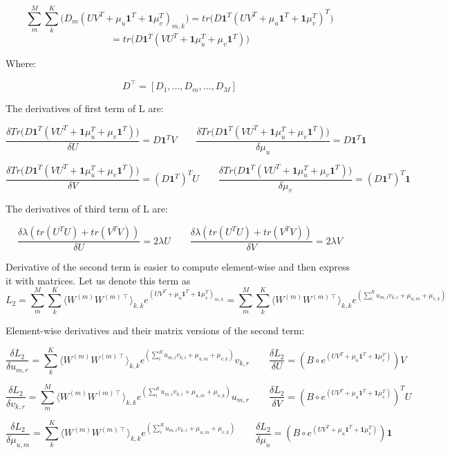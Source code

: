 \documentclass{article}
\begin{document}
$$\sum_m^M{\sum_k^K{\Big(D_m (UV^T+\mu_u\textbf{1}^T+\textbf{1}\mu_v^T)_{m,k}\Big)}} = tr\Big(D\textbf{1}^T(UV^T+\mu_u\textbf{1}^T+\textbf{1}\mu_v^T)^T\Big)$$
$$= tr\Big(D\textbf{1}^T(VU^T+\textbf{1}\mu_u^T+\mu_v\textbf{1}^T)\Big)$$

Where:

$$D^\intercal = [D_1,...,D_m,...,D_M]$$

The derivatives of first term of L are:

$$\frac{\delta Tr\Big(D\textbf{1}^T(VU^T+\textbf{1}\mu_u^T+\mu_v\textbf{1}^T)\Big)}{\delta U} = D\textbf{1}^TV \qquad \frac{\delta Tr\Big(D\textbf{1}^T(VU^T+\textbf{1}\mu_u^T+\mu_v\textbf{1}^T)\Big)}{\delta \mu_u} = D\textbf{1}^T\textbf{1}$$

$$\frac{\delta Tr\Big(D\textbf{1}^T(VU^T+\textbf{1}\mu_u^T+\mu_v\textbf{1}^T)\Big)}{\delta V} = (D\textbf{1}^T)^TU \qquad \frac{\delta Tr\Big(D\textbf{1}^T(VU^T+\textbf{1}\mu_u^T+\mu_v\textbf{1}^T)\Big)}{\delta \mu_v} = (D\textbf{1}^T)^T\textbf{1}$$

The derivatives of third term of L are:

$$\frac{\delta \lambda (tr(U^TU)+tr(V^TV))}{\delta U} = 2\lambda U \qquad \frac{\delta \lambda (tr(U^TU)+tr(V^TV))}{\delta V} = 2\lambda V$$

Derivative of the second term is easier to compute element-wise and then express it with matrices. Let us denote this term as $$L_2=\sum_m^M{\sum_k^K{\langle W^{(m)}W^{(m)\intercal}\rangle_{k,k}e^{(UV^T+\mu_u\textbf{1}^T+\textbf{1}\mu_v^T)_{m,k}} }} = \sum_m^M{\sum_k^K{\langle W^{(m)}W^{(m)\intercal}\rangle_{k,k}e^{(\sum_i^R{u_{m,i}v_{k,i}}+\mu_{u,m}+\mu_{v,k})} }}$$

Element-wise derivatives and their matrix versions of the second term:

$$\frac{\delta L_2}{\delta u_{m,r}} = \sum_k^K{\langle W^{(m)}W^{(m)\intercal}\rangle_{k,k}e^{(\sum_i^R{u_{m,i}v_{k,i}}+\mu_{u,m}+\mu_{v,k})}v_{k,r} } \qquad \frac{\delta L_2}{\delta U} = (B \circ e^{(UV^T+\mu_u\textbf{1}^T+\textbf{1}\mu_v^T)}) V$$

$$\frac{\delta L_2}{\delta v_{k,r}} = \sum_m^M{\langle W^{(m)}W^{(m)\intercal}\rangle_{k,k}e^{(\sum_i^R{u_{m,i}v_{k,i}}+\mu_{u,m}+\mu_{v,k})}u_{m,r} } \qquad \frac{\delta L_2}{\delta V} = (B \circ e^{(UV^T+\mu_u\textbf{1}^T+\textbf{1}\mu_v^T)})^T U$$

$$\frac{\delta L_2}{\delta \mu_{u,m}} = \sum_k^K{\langle W^{(m)}W^{(m)\intercal}\rangle_{k,k}e^{(\sum_i^R{u_{m,i}v_{k,i}}+\mu_{u,m}+\mu_{v,k})} } \qquad \frac{\delta L_2}{\delta \mu_u} = (B \circ e^{(UV^T+\mu_u\textbf{1}^T+\textbf{1}\mu_v^T)}) \textbf{1}$$
\end{document}
